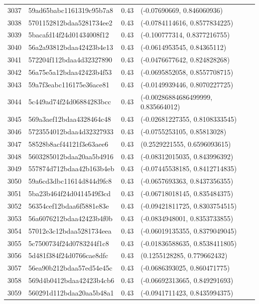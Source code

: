\begin{table}[ht]
\begin{tabular}{rlrl}
  3037 & 59ad65babc1161319c95b7a8 & 0.43 & (-0.07690669, 0.846060936) \\ 
  3038 & 5701152812bdaa5281734ee2 & 0.43 & (-0.0784114616, 0.8577834225) \\ 
  3039 & 5bacafd14f24d01434008f12 & 0.43 & (-0.100777314, 0.8377216755) \\ 
  3040 & 56a2a93812bdaa42423b4e13 & 0.43 & (-0.0614953545, 0.84365112) \\ 
  3041 & 572204f112bdaa4d32327890 & 0.43 & (-0.0476677642, 0.824828268) \\ 
  3042 & 56a75e5a12bdaa42423b4f53 & 0.43 & (-0.0695852058, 0.8557708715) \\ 
  3043 & 59a7f3eabc116175e36ace81 & 0.43 & (-0.0149939446, 0.8070227725) \\ 
  3044 & 5c449ad74f24d06884283bcc & 0.43 & (-0.00286884686499999, 0.835664012) \\ 
  3045 & 569a3aef12bdaa4328464c48 & 0.43 & (-0.02681227355, 0.8108333545) \\ 
  3046 & 5723554012bdaa4d32327933 & 0.43 & (-0.0755253105, 0.85813028) \\ 
  3047 & 58528b8acf44121f3e63aee6 & 0.43 & (0.2529221555, 0.6596093615) \\ 
  3048 & 5603285012bdaa20aa5b4916 & 0.43 & (-0.08312015035, 0.843996392) \\ 
  3049 & 557874d712bdaa42b163b4eb & 0.43 & (-0.07445538185, 0.8412714835) \\ 
  3050 & 59a6cd3dbc11614d844d9fc8 & 0.43 & (-0.0657693363, 0.8437356355) \\ 
  3051 & 5ba23b464f24d0414549f3cd & 0.43 & (-0.06718018145, 0.835484375) \\ 
  3052 & 56354cef12bdaa6f5881e83e & 0.43 & (-0.09421811725, 0.8303754515) \\ 
  3053 & 56a6076212bdaa42423b4f0b & 0.43 & (-0.0834948001, 0.8353733855) \\ 
  3054 & 57012e3c12bdaa5281734eea & 0.43 & (-0.06019135355, 0.8379049045) \\ 
  3055 & 5c7500734f24d0783244f1c8 & 0.43 & (-0.01836588635, 0.8538411805) \\ 
  3056 & 5d481f384f24d0766cae8dfc & 0.43 & (0.1255128285, 0.779662432) \\ 
  3057 & 56ea90b212bdaa57ed54e45c & 0.43 & (-0.0686393025, 0.860471775) \\ 
  3058 & 569d4b0412bdaa42423b4cb6 & 0.43 & (-0.06692313665, 0.849291693) \\ 
  3059 & 560291d112bdaa20aa5b48a1 & 0.43 & (-0.0941711423, 0.8435994375) \\ 

\end{tabular}
\end{table}
